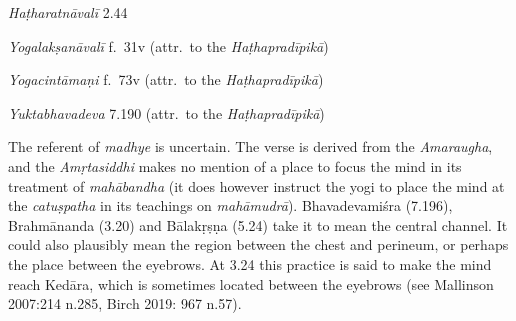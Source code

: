 \begin{ekdosis}
\begin{testimonia}[hp03_020]
\emph{Haṭharatnāvalī} 2.44
\begin{versinnote}
\tl{\var{nibhṛtya ] niṣpīḍya \vl}\\!}
\end{versinnote}

\emph{Yogalakṣanāvalī} f.~31v (attr.~to the \emph{Haṭhapradīpikā})
\begin{versinnote}
\end{versinnote}

\emph{Yogacintāmaṇi} f.~73v (attr.~to the \emph{Haṭhapradīpikā})
\begin{versinnote}
\end{versinnote}

\emph{Yuktabhavadeva} 7.190 (attr.~to the \emph{Haṭhapradīpikā})
\begin{versinnote}
\end{versinnote}
\end{testimonia}

\begin{philcomm}[hp03_020]
The referent of \emph{madhye} is uncertain. The verse is derived from the \emph{Amaraugha}, and the \emph{Amṛtasiddhi} makes no mention of a place to focus the mind in its treatment of \emph{mahābandha} (it does however instruct the yogi to place the mind at the \emph{catuṣpatha} in its teachings on \emph{mahāmudrā}). Bhavadevamiśra (7.196), Brahmānanda (3.20) and Bālakṛṣṇa (5.24) take it to mean the central channel. It could also plausibly mean the region between the chest and perineum, or perhaps the place between the eyebrows. At 3.24 this practice is said to make the mind reach Kedāra, which is sometimes located between the eyebrows (see Mallinson 2007:214 n.285, Birch 2019: 967 n.57).
\end{philcomm}


\end{ekdosis}

